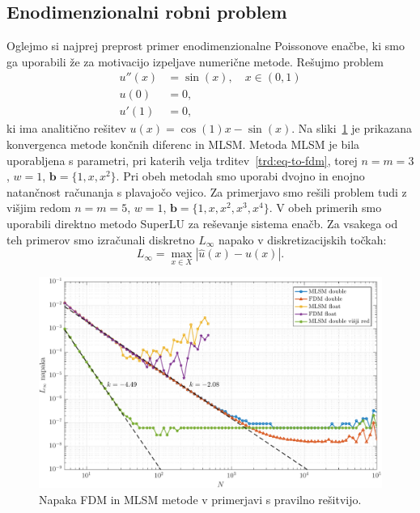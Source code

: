 \documentclass[a4paper,twoside]{article}
\theoremstyle{definition} %
\theoremstyle{plain} %
\numberwithin{equation}{section}
\renewcommand{\b}{\boldsymbol}
\newlength{\iw}
\begin{document}
\subsection{Enodimenzionalni robni problem}
Oglejmo si najprej preprost primer enodimenzionalne Poissonove enačbe, ki smo ga uporabili že za
motivacijo izpeljave numerične metode.
Rešujmo problem
\begin{align*}
  u''(x) &= \sin(x), \quad x \in (0, 1) \\
  u(0) &= 0, \\
  u'(1) &= 0,
\end{align*}
ki ima analitično rešitev $u(x) = \cos(1) x - \sin(x)$.
Na sliki~\ref{fig:mlsm-fdm-err} je prikazana konvergenca metode končnih diferenc
in MLSM. Metoda MLSM je bila uporabljena s parametri, pri katerih velja
trditev~\ref{trd:eq-to-fdm}, torej $n=m=3$, $w=1$, $\b b = \{1, x, x^2\}$.
Pri obeh metodah smo uporabi dvojno in enojno natančnost računanja s plavajočo
vejico.  Za primerjavo smo rešili problem tudi z višjim redom $n=m=5$, $w=1$,
$\b b = \{1, x, x^2, x^3, x^4\}$. V obeh primerih smo uporabili direktno metodo
SuperLU za reševanje sistema enačb. Za vsakega od teh primerov smo izračunali
diskretno $L_\infty$ napako v diskretizacijskih točkah: \[ L_\infty = \max_{x\in
X} |\hat{u}(x) - u(x)|.  \]

\begin{figure}[h]
  \centering
  \includegraphics[width=\iw]{images/lap1d_convergence.pdf}
  \caption{Napaka FDM in MLSM metode v primerjavi s pravilno rešitvijo.}
  \label{fig:mlsm-fdm-err}
\end{figure}
\end{document}
